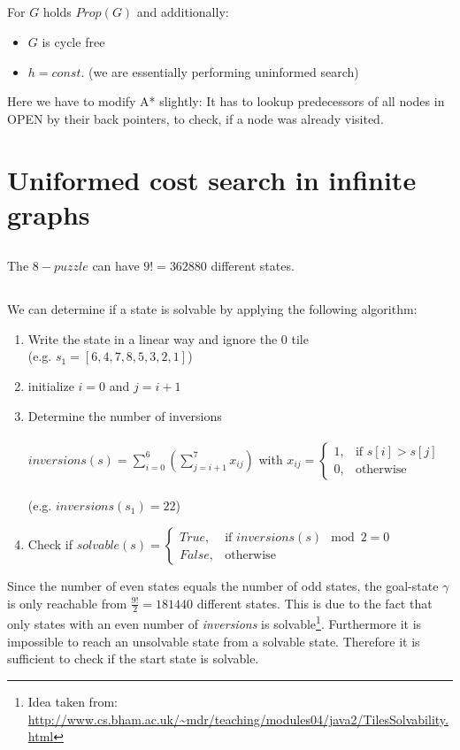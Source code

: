 \documentclass[11pt]{article}
\begin{document}
\subsection{}
For $G$ holds $Prop(G)$ and additionally:
\begin{itemize}
\item $G$ is cycle free
\item $h=const.$ (we are essentially performing uninformed search)
\end{itemize}
Here we have to modify A* slightly: It has to lookup predecessors of all nodes in OPEN by their back pointers, to check, if a node was already visited.

\setcounter{section}{6}
\section{Uniformed cost search in infinite graphs}

\subsection{}
The $8-puzzle$ can have $9!=362880$ different states.

\subsection{}
We can determine if a state is solvable by applying the following algorithm:
\begin{enumerate}
	\item Write the state in a linear way and ignore the $0$ tile \\(e.g. $s_1=[6,4,7,8,5,3,2,1]$)
	\item initialize $i=0$ and $j=i+1$
	\item Determine the number of inversions\\\\$inversions(s) = \displaystyle{\sum_{i=0}^6\left(\sum_{j=i+1}^7x_{ij}\right)}$ with $x_{ij}=
	\begin{cases}
    	1,		& \text{if } s[i]>s[j]\\
   		0,      & \text{otherwise}
	\end{cases}$\\\\(e.g. $inversions(s_1)=22$)
	\item Check if  $solvable(s) = \begin{cases}
    	True,		& \text{if } inversions(s) \mod 2 = 0\\
   		False,      & \text{otherwise}
	\end{cases}$
\end{enumerate}
Since the number of even states equals the number of odd states, the goal-state $\gamma$ is only reachable from $\frac{9!}{2}=181440$ different states. This is due to the fact that only states with an even number of \emph{inversions} is solvable\footnote{Idea taken from: \url{http://www.cs.bham.ac.uk/~mdr/teaching/modules04/java2/TilesSolvability.html} }. Furthermore it is impossible to reach an unsolvable state from a solvable state. Therefore it is sufficient to check if the start state is solvable. 
\end{document}
